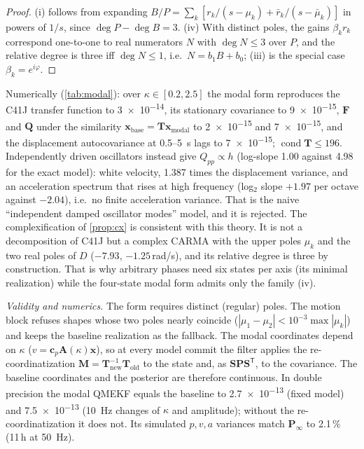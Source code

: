 \documentclass[conference]{IEEEtran}
\DeclareRobustCommand{\vct}[1]{\bm{#1}}
\DeclareRobustCommand{\mat}[1]{\bm{#1}}
\theoremstyle{bodysmall}
\begin{document}
\begin{proof}
(i) follows from expanding $B/P=\sum_k[r_k/(s-\mu_k)+\bar r_k/(s-\bar\mu_k)]$ in
powers of $1/s$, since $\deg P-\deg B=3$. (iv) With distinct poles, the
gains $\beta_kr_k$ correspond one-to-one to real numerators $N$ with
$\deg N\le3$ over $P$, and the relative degree is three iff $\deg N\le1$,
i.e.\ $N=b_1B+b_0$; (iii) is the special case $\beta_k=e^{i\varphi}$.
\end{proof}
Numerically (\cref{tab:modal}): over $\kappa\in[0.2,2.5]$ the modal form
reproduces the C41J transfer function to \num{3e-14}, its stationary
covariance to \num{9e-15}, $\mat F$ and $\mat Q$ under the similarity
$\vct x_{\mathrm{base}}=\mat T\vct x_{\mathrm{modal}}$ to \num{2e-15} and
\num{7e-15}, and the displacement autocovariance at 0.5--\SI{5}{s} lags to
\num{7e-15}; $\operatorname{cond}\mat T\le196$. Independently driven
oscillators instead give $Q_{pp}\propto h$ (log-slope 1.00 against 4.98 for
the exact model): white velocity, 1.387 times the displacement variance, and
an acceleration spectrum that rises at high frequency (log$_2$ slope $+1.97$
per octave against $-2.04$), i.e.\ no finite acceleration variance. That is
the naive ``independent damped oscillator modes'' model, and it is rejected.
The complexification of \cref{prop:cx} is consistent with this theory. It
is not a decomposition of C41J but a complex CARMA with the upper poles
$\mu_k$ and the two real poles of $D$ ($-7.93$, $-1.25$\,rad/s), and its
relative degree is three by construction. That is why arbitrary phases need
six states per axis (its minimal realization) while the four-state modal form
admits only the family (iv).

\emph{Validity and numerics.} The form requires distinct (regular) poles.
The motion block refuses shapes whose two poles nearly coincide
($|\mu_1-\mu_2|<10^{-3}\max|\mu_k|$) and keeps the baseline realization as the
fallback. The modal coordinates depend on $\kappa$ ($v=\vct c_p\mat
A(\kappa)\vct x$), so at every model commit the filter applies the
re-coordinatization $\mat M=\mat T_{\mathrm{new}}^{-1}\mat T_{\mathrm{old}}$
to the state and, as $\mat S\mat P\mat S^{\mathsf T}$, to the covariance.
The baseline coordinates and the posterior are therefore continuous. In
double precision the modal QMEKF equals the baseline to \num{2.7e-13}
(fixed model) and \num{7.5e-13} (\SI{10}{Hz} changes of $\kappa$ and
amplitude); without the re-coordinatization it does not. Its simulated
$p,v,a$ variances match $\mat P_\infty$ to 2.1\,\% (11\,h at \SI{50}{Hz}).
\end{document}
